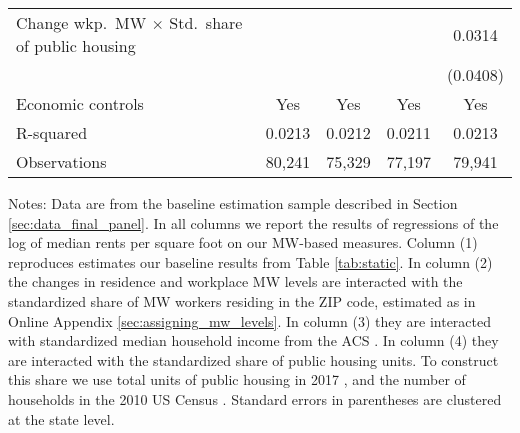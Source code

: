 \begin{table}[hbt!]
\begin{tabular}{@{}lcccc@{}}
        Change wkp.\ MW $\times$ Std.\ share of public housing &        &       &        &  0.0314   \\
                                                               &        &       &        & (0.0408)  \\ \midrule
        Economic controls                                      &  Yes   &  Yes  &   Yes  &  Yes   \\
        R-squared                                              &  0.0213   &  0.0212  &   0.0211  &  0.0213   \\
        Observations                                           &  80,241  &  75,329 &   77,197 &  79,941  \\ \bottomrule
    \end{tabular}

    \begin{minipage}{.95\linewidth} \footnotesize
        \vspace{2mm}
        Notes: 
        Data are from the baseline estimation sample described in Section 
        \ref{sec:data_final_panel}.
        In all columns we report the results of regressions of the log of median 
        rents per square foot on our MW-based measures.
        Column (1) reproduces estimates our baseline results from Table 
        \ref{tab:static}.
        In column (2) the changes in residence and workplace MW levels are 
        interacted with the standardized share of MW workers residing in 
        the ZIP code, estimated as in Online Appendix 
        \ref{sec:assigning_mw_levels}.
        In column (3) they are interacted with standardized median household 
        income from the ACS \parencite{CensusACS}.
        In column (4) they are interacted with the standardized share of 
        public housing units.
        To construct this share we use total units of public housing in 2017 
        \parencite{hudHousing}, and the number of households in the 2010
        US Census \parencite{CensusDecennial}.
        Standard errors in parentheses are clustered at the state level.
    \end{minipage}
\end{table}
